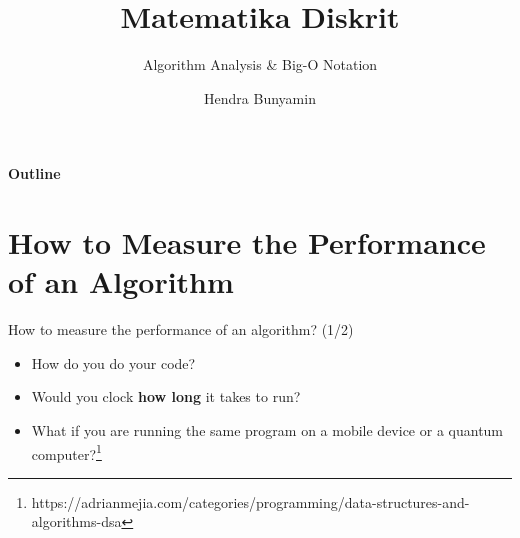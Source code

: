 \documentclass[pdf]{beamer}
\title[Time Complexity \& Big O Notation] %
{\textbf{Matematika Diskrit}}
\subtitle
{Algorithm Analysis \& Big-O Notation}
\author[Hendra Bunyamin] %
{Hendra Bunyamin}
\institute[ ] %
{
  Jurusan Teknik Informatika\\
  Fakultas Teknologi Informasi\\
  Universitas Kristen Maranatha
}
\theoremstyle{mystyle}
\let\emph\relax %
\begin{document}
\begin{frame}
  \titlepage
\end{frame}

\begin{frame}{\textbf{Outline}}
  \tableofcontents
\end{frame}






\section{How to Measure the Performance of an Algorithm}
\begin{frame}{How to measure the performance of an algorithm? (1/2)}
	\begin{itemize}
		\item How do you do \emph{measure} your code? 
		\item Would you clock \textbf{how long} it takes to run?
		\item What if you are running the same program on a mobile device or a quantum computer?\footnote{https://adrianmejia.com/categories/programming/data-structures-and-algorithms-dsa}
	\end{itemize}
	\begin{center}
	\noindent{}	
	\end{center}
\end{frame}

\end{document}
